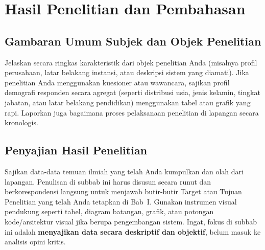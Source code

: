 \chapter{Hasil Penelitian dan Pembahasan}



\section{Gambaran Umum Subjek dan Objek Penelitian}

Jelaskan secara ringkas karakteristik dari objek penelitian Anda (misalnya profil perusahaan, latar belakang instansi, atau deskripsi sistem yang diamati). Jika penelitian Anda menggunakan kuesioner atau wawancara, sajikan profil demografi responden secara agregat (seperti distribusi usia, jenis kelamin, tingkat jabatan, atau latar belakang pendidikan) menggunakan tabel atau grafik yang rapi. Laporkan juga bagaimana proses pelaksanaan penelitian di lapangan secara kronologis.



\section{Penyajian Hasil Penelitian}

Sajikan data-data temuan ilmiah yang telah Anda kumpulkan dan olah dari lapangan. Penulisan di subbab ini harus disusun secara runut dan berkorespondensi langsung untuk menjawab butir-butir Target atau Tujuan Penelitian yang telah Anda tetapkan di Bab~I. Gunakan instrumen visual pendukung seperti tabel, diagram batangan, grafik, atau potongan kode/arsitektur visual jika berupa pengembangan sistem. Ingat, fokus di subbab ini adalah \textbf{menyajikan data secara deskriptif dan objektif}, belum masuk ke analisis opini kritis.



